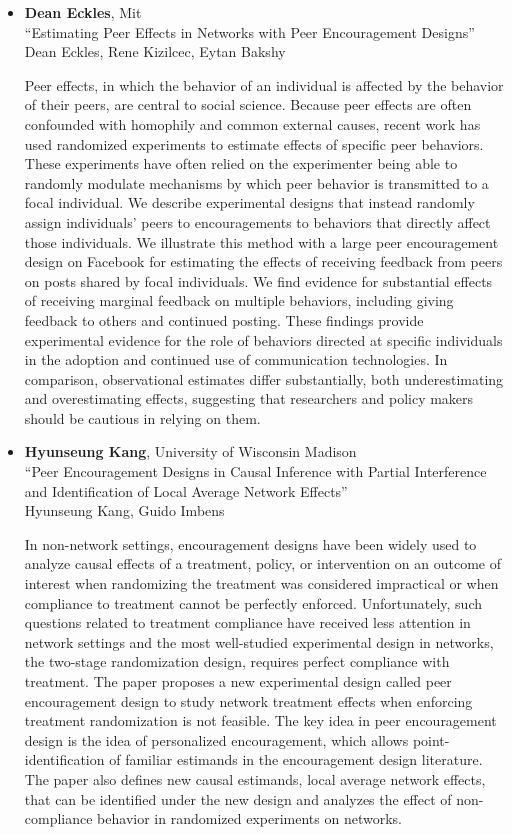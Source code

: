 \begin{itemize}
\item \textbf{Dean Eckles}, Mit \\
``Estimating Peer Effects in Networks with Peer Encouragement Designs'' \\
Dean Eckles, Rene Kizilcec, Eytan Bakshy


Peer effects, in which the behavior of an individual is affected by the behavior of their peers, are central to social science. Because peer effects are often confounded with homophily and common external causes, recent work has used randomized experiments to estimate effects of specific peer behaviors. These experiments have often relied on the experimenter being able to randomly modulate mechanisms by which peer behavior is transmitted to a focal individual. We describe experimental designs that instead randomly assign individuals’ peers to encouragements to behaviors that directly affect those individuals. We illustrate this method with a large peer encouragement design on Facebook for estimating the effects of receiving feedback from peers on posts shared by focal individuals. We find evidence for substantial effects of receiving marginal feedback on multiple behaviors, including giving feedback to others and continued posting. These findings provide experimental evidence for the role of behaviors directed at specific individuals in the adoption and continued use of communication technologies. In comparison, observational estimates differ substantially, both underestimating and overestimating effects, suggesting that researchers and policy makers should be cautious in relying on them.

\item \textbf{Hyunseung Kang}, University of Wisconsin Madison \\
``Peer Encouragement Designs in Causal Inference with Partial Interference and Identification of Local Average Network Effects'' \\
Hyunseung Kang, Guido Imbens


In non-network settings, encouragement designs have been widely used to analyze causal effects of a treatment, policy, or intervention on an outcome of interest when randomizing the treatment was considered impractical or when compliance to treatment cannot be perfectly enforced. Unfortunately, such questions related to treatment compliance have received less attention in network settings and the most well-studied experimental design in networks, the two-stage randomization design, requires perfect compliance with treatment. The paper proposes a new experimental design called peer encouragement design to study network treatment effects when enforcing treatment randomization is not feasible. The key idea in peer encouragement design is the idea of personalized  encouragement, which allows point-identification of familiar estimands in the encouragement design literature. The paper also defines new causal estimands, local average network effects, that can be identified under the new design and analyzes the effect of non-compliance behavior in randomized experiments on networks.


\end{itemize}
